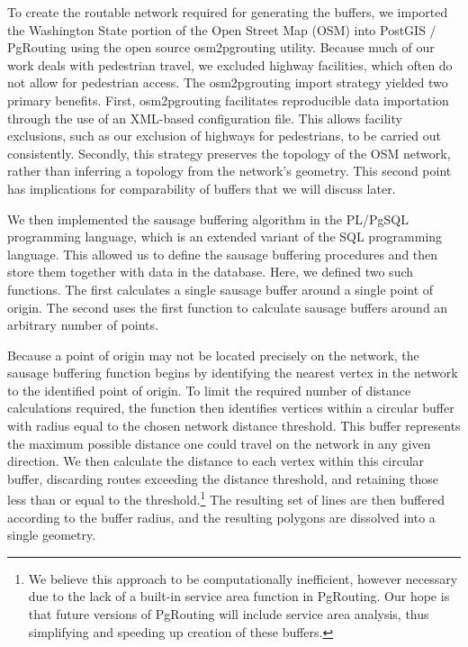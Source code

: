 \documentclass[11pt,letterpaper]{article} %
\begin{document}
To create the routable network required for generating the buffers, we
imported the Washington State portion of the Open Street Map (OSM)
into PostGIS / PgRouting using the open source osm2pgrouting
utility. Because much of our work deals with pedestrian travel, we
excluded highway facilities, which often do not allow for pedestrian
access. The osm2pgrouting import strategy yielded two primary
benefits. First, osm2pgrouting facilitates reproducible data
importation through the use of an XML-based configuration file. This
allows facility exclusions, such as our exclusion of highways for
pedestrians, to be carried out consistently. Secondly, this strategy
preserves the topology of the OSM network, rather than inferring a
topology from the network's geometry. This second point has
implications for comparability of buffers that we will discuss later.


We then implemented the sausage buffering algorithm in the PL/PgSQL
programming language, which is an extended variant of the SQL
programming language. This allowed us to define the sausage buffering
procedures and then store them together with data in the
database. Here, we defined two such functions. The first calculates a
single sausage buffer around a single point of origin. The second uses
the first function to calculate sausage buffers around an arbitrary
number of points.

Because a point of origin may not be located precisely on the network,
the sausage buffering function begins by identifying the nearest
vertex in the network to the identified point of origin. To limit the
required number of distance calculations required, the function then
identifies vertices within a circular buffer with radius equal to the
chosen network distance threshold. This buffer represents the maximum
possible distance one could travel on the network in any given
direction. We then calculate the distance to each vertex within this
circular buffer, discarding routes exceeding the distance threshold,
and retaining those less than or equal to the threshold.\footnote{We
  believe this approach to be computationally inefficient, however
  necessary due to the lack of a built-in service area function in
  PgRouting. Our hope is that future versions of PgRouting will
  include service area analysis, thus simplifying and speeding up
  creation of these buffers.} The resulting set of lines are then
buffered according to the buffer radius, and the resulting polygons
are dissolved into a single geometry.
\end{document}
